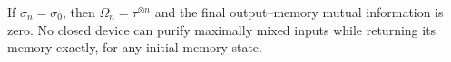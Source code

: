 \begin{corollary}\label{cor:exactreturn}
If $\sigma_n=\sigma_0$, then $\Omega_n=\tau^{\otimes n}$ and the final output--memory mutual information is zero. No closed device can purify maximally mixed inputs while returning its memory exactly, for any initial memory state.
\end{corollary}
